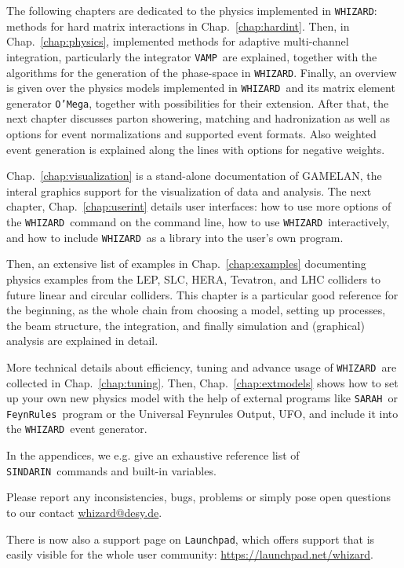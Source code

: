 \documentclass[12pt]{book}
\newcommand{\ttt}[1]{\texttt{#1}}
\newcommand{\whizard}{\ttt{WHIZARD}}
\newcommand{\oMega}{\ttt{O'Mega}}
\newcommand{\vamp}{\ttt{VAMP}}
\newcommand{\sarah}{\ttt{SARAH}}
\newcommand{\FeynRules}{\ttt{FeynRules}}
\newcommand{\sindarin}{\ttt{SINDARIN}}
\begin{document}
The following chapters are dedicated to the physics implemented in
\whizard: methods for hard matrix interactions in
Chap.~\ref{chap:hardint}. Then, in Chap.~\ref{chap:physics},
implemented methods for adaptive multi-channel integration,
particularly the integrator \vamp\ are explained, together with the
algorithms for the generation of the phase-space in \whizard. Finally,
an overview is given over the physics models implemented in \whizard\
and its matrix element generator \oMega, together with possibilities
for their extension. After that, the next chapter discusses parton
showering, matching and hadronization as well as options for event
normalizations and supported event formats. Also weighted event
generation is explained along the lines with options for negative
weights.

Chap.~\ref{chap:visualization} is a stand-alone documentation of
GAMELAN, the interal graphics support for the visualization of data
and analysis. The next chapter, Chap.~\ref{chap:userint} details user
interfaces: how to use more options of the \whizard\ command on the
command line, how to use \whizard\ interactively, and how to include
\whizard\ as a library into the user's own program.

Then, an extensive list of examples in Chap.~\ref{chap:examples}
documenting physics examples from the LEP, SLC, HERA, Tevatron, and
LHC colliders to future linear and circular colliders. This chapter is
a particular good reference for the beginning, as the whole chain from
choosing a model, setting up processes, the beam structure, the
integration, and finally simulation and (graphical) analysis are
explained in detail.

More technical details about efficiency, tuning and advance usage of
\whizard\ are collected in Chap.~\ref{chap:tuning}. Then,
Chap.~\ref{chap:extmodels} shows how to set up your own new physics
model with the help of external programs like \sarah\ or
\FeynRules\ program or the Universal Feynrules Output, UFO, and
include it into the \whizard\ event generator.

In the appendices, we e.g. give an exhaustive reference list of
\sindarin\ commands and built-in variables.

Please report any inconsistencies, bugs, problems or simply pose open
questions to our contact \url{whizard@desy.de}.

There is now also a support page on \texttt{Launchpad}, which offers
support that is easily visible for the whole user community:
\url{https://launchpad.net/whizard}.
\end{document}
